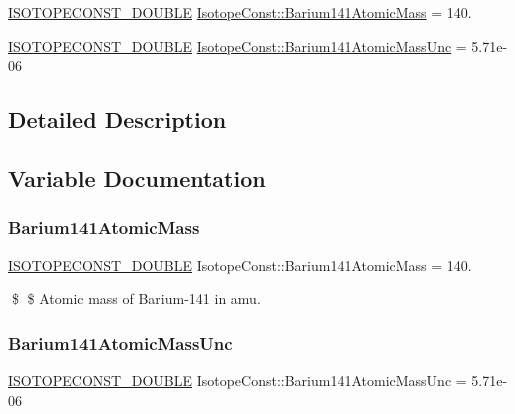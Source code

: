 \begin{DoxyCompactItemize}
\item 
\mbox{\hyperlink{group___isotope_const-_macros_ga8f45a7272ce02c0b4c65c44636ed719a}{I\+S\+O\+T\+O\+P\+E\+C\+O\+N\+S\+T\+\_\+\+D\+O\+U\+B\+LE}} \mbox{\hyperlink{group___isotope_const-_barium-_ba141_gaa724a58dcfc930836bdf298d962b818b}{Isotope\+Const\+::\+Barium141\+Atomic\+Mass}} = 140.
\item 
\mbox{\hyperlink{group___isotope_const-_macros_ga8f45a7272ce02c0b4c65c44636ed719a}{I\+S\+O\+T\+O\+P\+E\+C\+O\+N\+S\+T\+\_\+\+D\+O\+U\+B\+LE}} \mbox{\hyperlink{group___isotope_const-_barium-_ba141_gab9cd560e00ff73a005ba951b270e426b}{Isotope\+Const\+::\+Barium141\+Atomic\+Mass\+Unc}} = 5.\+71e-\/06
\end{DoxyCompactItemize}


\subsection{Detailed Description}


\subsection{Variable Documentation}
\mbox{\label{group___isotope_const-_barium-_ba141_gaa724a58dcfc930836bdf298d962b818b}} 
\subsubsection{\texorpdfstring{Barium141\+Atomic\+Mass}{Barium141AtomicMass}}
{\footnotesize\ttfamily \mbox{\hyperlink{group___isotope_const-_macros_ga8f45a7272ce02c0b4c65c44636ed719a}{I\+S\+O\+T\+O\+P\+E\+C\+O\+N\+S\+T\+\_\+\+D\+O\+U\+B\+LE}} Isotope\+Const\+::\+Barium141\+Atomic\+Mass = 140.}

\$ \$ Atomic mass of Barium-\/141 in amu. \mbox{\label{group___isotope_const-_barium-_ba141_gab9cd560e00ff73a005ba951b270e426b}} 
\subsubsection{\texorpdfstring{Barium141\+Atomic\+Mass\+Unc}{Barium141AtomicMassUnc}}
{\footnotesize\ttfamily \mbox{\hyperlink{group___isotope_const-_macros_ga8f45a7272ce02c0b4c65c44636ed719a}{I\+S\+O\+T\+O\+P\+E\+C\+O\+N\+S\+T\+\_\+\+D\+O\+U\+B\+LE}} Isotope\+Const\+::\+Barium141\+Atomic\+Mass\+Unc = 5.\+71e-\/06}

